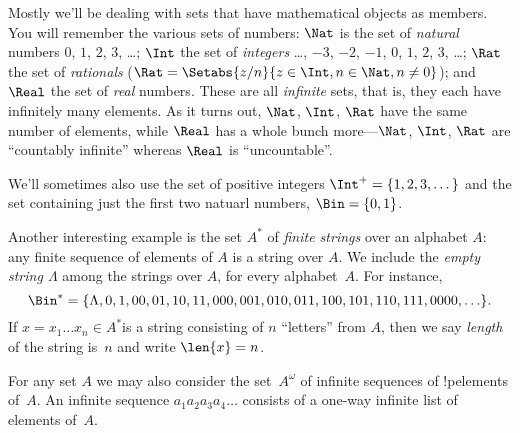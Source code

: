 \documentclass[../../include/open-logic-section]{subfiles}
\begin{document}

\begin{ex}
Mostly we'll be dealing with sets that have mathematical objects as
members. You will remember the various sets of numbers: $\Nat$
is the set of \emph{natural} numbers $0$, $1$, $2$, $3$, \dots{};
$\Int$ the set of \emph{integers} \ldots{}, $-3$, $-2$,
$-1$, $0$, $1$, $2$, $3$, \ldots{}; $\Rat$ the set of
\emph{rationals} ($\Rat = \Setabs{z/n}{z \in \Int, n \in \Nat, n \neq 0}$); and
$\Real$ the set of \emph{real} numbers. These are all \emph{infinite}
sets, that is, they each have infinitely many elements. As it turns
out, $\Nat$, $\Int$, $\Rat$ have the same number
of elements, while $\Real$ has a whole bunch more---$\Nat$,
$\Int$, $\Rat$ are ``countably infinite'' whereas
$\Real$ is ``uncountable''.

We'll sometimes also use the set of positive integers $\Int^+ = \{1,
2, 3, \dots\}$ and the set containing just the first two natuarl
numbers, $\Bin = \{0, 1\}$.
\end{ex}

\begin{ex}[Strings]
Another interesting example  is the set $A^{*}$ of
\emph{finite strings} over an alphabet $A$: any finite sequence of elements of
$A$ is a string over $A$. We include the \emph{empty string $\Lambda$}
among the strings over $A$, for every alphabet~$A$. For instance,
\[
\Bin^*
=\{\Lambda,0,1,00,01,10,11,000,001,010,011,100,101,110,111,0000,\ldots\}.
\]
If $x=x_{1}\ldots x_{n}\in A^{*}$is a string consisting of $n$
``letters'' from $A$, then we say \emph{length} of the string is~$n$
and write $\len{x}=n$.
\end{ex}

\begin{ex}
For any set $A$ we may also consider the set~$A^\omega$ of infinite
sequences of !p{elements} of~$A$. An infinite sequence
$a_1a_2a_3a_4\dots$ consists of a one-way infinite list of elements
of~$A$.
\end{ex}
\end{document}

